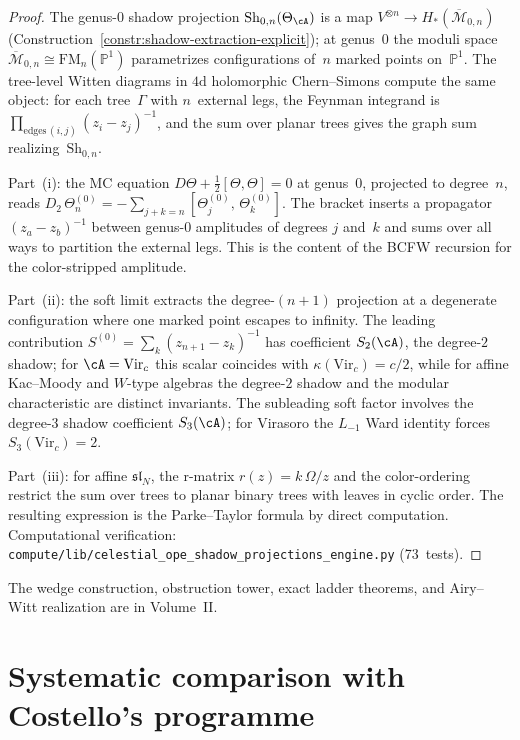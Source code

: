 \begin{proof}
The genus-$0$ shadow projection
$\mathrm{Sh}_{0,n}(\Theta_\cA)$ is a map
$V^{\otimes n} \to H_*(\overline{\mathcal{M}}_{0,n})$
(Construction~\ref{constr:shadow-extraction-explicit});
at genus~$0$ the moduli space
$\overline{\mathcal{M}}_{0,n} \cong \mathrm{FM}_n(\mathbb{P}^1)$
parametrizes configurations of~$n$ marked points on~$\mathbb{P}^1$.
The tree-level Witten diagrams in $4\mathrm{d}$ holomorphic
Chern--Simons compute the same object: for each tree~$\Gamma$
with $n$~external legs, the Feynman integrand is
$\prod_{\text{edges}\,(i,j)} (z_i - z_j)^{-1}$, and the sum
over planar trees gives the graph sum
realizing~$\mathrm{Sh}_{0,n}$.

Part~(i): the MC equation
$D\Theta + \frac{1}{2}[\Theta,\Theta] = 0$ at genus~$0$,
projected to degree~$n$, reads
$D_2\,\Theta_n^{(0)}
= -\sum_{j+k=n} [\Theta_j^{(0)},\,\Theta_k^{(0)}]$.
The bracket inserts a propagator $(z_a - z_b)^{-1}$ between
genus-$0$ amplitudes of degrees $j$ and~$k$ and sums over all
ways to partition the external legs. This is the content of the
BCFW recursion for the color-stripped amplitude.

Part~(ii): the soft limit
extracts the degree-$(n{+}1)$ projection at a degenerate
configuration where one marked point escapes to infinity.
The leading contribution
$S^{(0)} = \sum_k (z_{n+1} - z_k)^{-1}$ has coefficient
$S_2(\cA)$, the degree-$2$ shadow; for $\cA = \mathrm{Vir}_c$
this scalar coincides with $\kappa(\mathrm{Vir}_c) = c/2$,
while for affine Kac--Moody and $W$-type algebras the degree-$2$
shadow and the modular characteristic are distinct invariants.
The subleading soft factor involves the degree-$3$ shadow
coefficient $S_3(\cA)$; for Virasoro the $L_{-1}$ Ward identity
forces $S_3(\mathrm{Vir}_c) = 2$.

Part~(iii): for affine $\mathfrak{sl}_N$, the r-matrix
$r(z) = k\,\Omega/z$
and the color-ordering restrict the sum over trees to planar
binary trees with leaves in cyclic order. The resulting
expression is the Parke--Taylor formula by direct computation.
Computational verification:
\texttt{compute/lib/celestial\_ope\_shadow\_projections\_engine.py}
(73~tests).
\end{proof}

The wedge construction, obstruction tower, exact ladder theorems,
and Airy--Witt realization are in Volume~II\@.

\section{Systematic comparison with Costello's programme}
\label{sec:costello-comparison}


